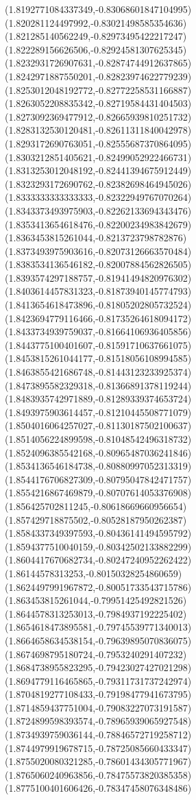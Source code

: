 \documentclass[12pt]{article}
\theoremstyle{plain}
\theoremstyle{definition}
\theoremstyle{remark}
\begin{document}
\begin{figure}
{  (1.8192771084337349,-0.83068601847104995)%
  (1.820281124497992,-0.83021498585354636)%
  (1.821285140562249,-0.82973495422217247)%
  (1.822289156626506,-0.82924581307625345)%
  (1.8232931726907631,-0.82874744912637865)%
  (1.8242971887550201,-0.82823974622779239)%
  (1.8253012048192772,-0.82772258531166887)%
  (1.8263052208835342,-0.82719584431404503)%
  (1.8273092369477912,-0.82665939810251732)%
  (1.8283132530120481,-0.82611311840042978)%
  (1.8293172690763051,-0.82555687370864095)%
  (1.8303212851405621,-0.82499052922466731)%
  (1.8313253012048192,-0.82441394675912449)%
  (1.8323293172690762,-0.82382698464945026)%
  (1.8333333333333333,-0.82322949767070264)%
  (1.8343373493975903,-0.82262133694343476)%
  (1.8353413654618476,-0.82200234983842679)%
  (1.8363453815261044,-0.8213723798782876)%
  (1.8373493975903616,-0.82073126663570484)%
  (1.8383534136546182,-0.82007884562826505)%
  (1.8393574297188757,-0.81941494820976302)%
  (1.8403614457831323,-0.81873940145774793)%
  (1.8413654618473896,-0.81805202805732524)%
  (1.8423694779116466,-0.81735264618094172)%
  (1.8433734939759037,-0.81664106936405856)%
  (1.8443775100401607,-0.81591710637661075)%
  (1.8453815261044177,-0.81518056108994585)%
  (1.8463855421686748,-0.81443123233925374)%
  (1.8473895582329318,-0.81366891378119244)%
  (1.8483935742971889,-0.81289339374653724)%
  (1.8493975903614457,-0.81210445508771079)%
  (1.8504016064257027,-0.81130187502100637)%
  (1.8514056224899598,-0.81048542496318732)%
  (1.8524096385542168,-0.80965487036241846)%
  (1.8534136546184738,-0.80880997052313319)%
  (1.8544176706827309,-0.80795047842471757)%
  (1.8554216867469879,-0.80707614053376908)%
  (1.856425702811245,-0.80618669660956654)%
  (1.857429718875502,-0.80528187950262387)%
  (1.8584337349397593,-0.80436141494595792)%
  (1.8594377510040159,-0.80342502133882299)%
  (1.8604417670682734,-0.80247240952262422)%
  (1.86144578313253,-0.80150328254860659)%
  (1.8624497991967872,-0.80051733543715786)%
  (1.863453815261044,-0.79951425492821526)%
  (1.8644578313253013,-0.7984937192225402)%
  (1.8654618473895581,-0.79745539771340013)%
  (1.8664658634538154,-0.79639895070836075)%
  (1.8674698795180724,-0.7953240291407232)%
  (1.8684738955823295,-0.79423027427021298)%
  (1.8694779116465865,-0.79311731737242974)%
  (1.8704819277108433,-0.79198477941673795)%
  (1.8714859437751004,-0.79083227073191587)%
  (1.8724899598393574,-0.78965939065927548)%
  (1.8734939759036144,-0.78846572719258712)%
  (1.8744979919678715,-0.78725085660433347)%
  (1.8755020080321285,-0.78601434305771967)%
  (1.8765060240963856,-0.78475573820385358)%
  (1.8775100401606426,-0.78347458076348486)%
}
\end{figure}
\end{document}

